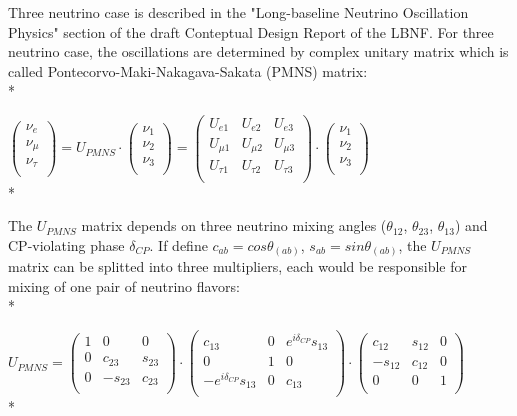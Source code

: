 Three neutrino case is described in the "Long-baseline Neutrino Oscillation Physics" section of the draft Conteptual Design Report of the LBNF. For three neutrino case, the oscillations are determined by complex unitary matrix which is called Pontecorvo-Maki-Nakagava-Sakata (PMNS) matrix:\\*

$ \begin{pmatrix} \nu_{e} \\ \nu_{\mu} \\ \nu_{\tau} \\ \end{pmatrix}
 = U_{PMNS}\cdot \begin{pmatrix} \nu_{1} \\ \nu_{2} \\ \nu_{3} \\ \end{pmatrix} = 
 \begin{pmatrix}
  U_{e1} & U_{e2} & U_{e3} \\
  U_{\mu1} & U_{\mu2} & U_{\mu3} \\
  U_{\tau1} & U_{\tau2} & U_{\tau3} \\
 \end{pmatrix}
 \cdot
\begin{pmatrix} \nu_{1} \\ \nu_{2} \\ \nu_{3} \\ \end{pmatrix}$\\*

The $U_{PMNS}$ matrix depends on three neutrino mixing angles ($\theta_{12}$, $\theta_{23}$, $\theta_{13}$) and CP-violating phase $\delta_{CP}$. If define $c_{ab}=cos\theta_(ab)$, $s_{ab}=sin\theta_(ab)$, the $U_{PMNS}$ matrix can be splitted into three multipliers, each would be responsible for mixing of one pair of neutrino flavors:\\*

$U_{PMNS} =
 \begin{pmatrix}
  1 & 0 & 0 \\
  0 & c_{23} & s_{23} \\
  0 & -s_{23} & c_{23} \\
 \end{pmatrix}
 \cdot
 \begin{pmatrix}
  c_{13} & 0 & e^{i\delta_{CP}}s_{13} \\
  0 & 1 & 0 \\
  -e^{i\delta_{CP}}s_{13} & 0 & c_{13} \\
 \end{pmatrix}
 \cdot
 \begin{pmatrix}
  c_{12} & s_{12} & 0 \\
  -s_{12} & c_{12} & 0 \\
  0 & 0 & 1 \\
 \end{pmatrix}$ \\*

